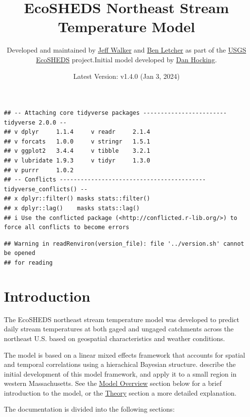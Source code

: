 \documentclass[
]{book}
\title{EcoSHEDS Northeast Stream Temperature Model}
\author{Developed and maintained by \href{https://walkerenvres.com}{Jeff Walker} and \href{https://www.usgs.gov/staff-profiles/benjamin-h-letcher}{Ben Letcher} as part of the \href{https://usgs.gov/apps/ecosheds/}{USGS EcoSHEDS} project.Initial model developed by \href{https://hockinglab.weebly.com/}{Dan Hocking}.}
\date{Latest Version: v1.4.0 (Jan 3, 2024)}
\begin{document}
\maketitle

{
\setcounter{tocdepth}{1}
\tableofcontents
}
\begin{verbatim}
## -- Attaching core tidyverse packages ------------------------ tidyverse 2.0.0 --
## v dplyr     1.1.4     v readr     2.1.4
## v forcats   1.0.0     v stringr   1.5.1
## v ggplot2   3.4.4     v tibble    3.2.1
## v lubridate 1.9.3     v tidyr     1.3.0
## v purrr     1.0.2     
## -- Conflicts ------------------------------------------ tidyverse_conflicts() --
## x dplyr::filter() masks stats::filter()
## x dplyr::lag()    masks stats::lag()
## i Use the conflicted package (<http://conflicted.r-lib.org/>) to force all conflicts to become errors
\end{verbatim}

\begin{verbatim}
## Warning in readRenviron(version_file): file '../version.sh' cannot be opened
## for reading
\end{verbatim}

\chapter{Introduction}\label{intro}

The EcoSHEDS northeast stream temperature model was developed to predict daily stream temperatures at both gaged and ungaged catchments across the northeast U.S. based on geospatial characteristics and weather conditions.

The model is based on a linear mixed effects framework that accounts for spatial and temporal correlations using a hierachical Bayesian structure. \citet{Letcher2016} describe the initial development of this model framework, and apply it to a small region in western Massachusetts. See the \hyperref[model-overview]{Model Overview} section below for a brief introduction to the model, or the \hyperref[theory]{Theory} section a more detailed explanation.

The documentation is divided into the following sections:
\end{document}
